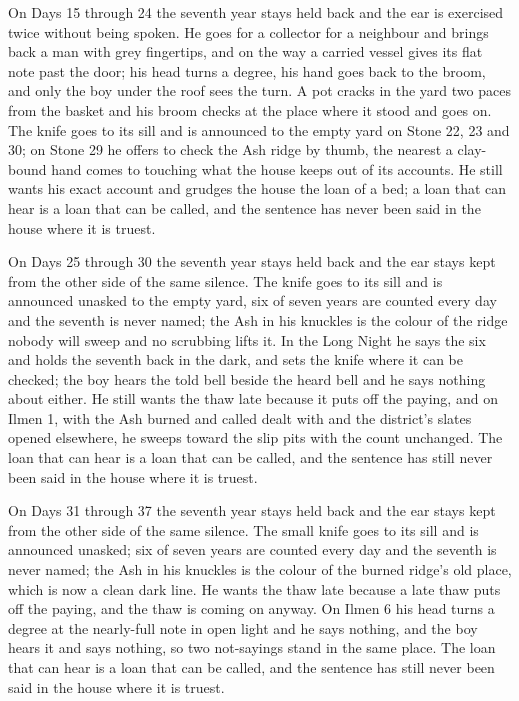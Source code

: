 \documentclass{design/chronicle}
\begin{document}
{On Days 15 through 24 the seventh year stays held back and the ear is exercised twice without being spoken. He goes for a collector for a neighbour and brings back a man with grey fingertips, and on the way a carried vessel gives its flat note past the door; his head turns a degree, his hand goes back to the broom, and only the boy under the roof sees the turn. A pot cracks in the yard two paces from the basket and his broom checks at the place where it stood and goes on. The knife goes to its sill and is announced to the empty yard on Stone 22, 23 and 30; on Stone 29 he offers to check the Ash ridge by thumb, the nearest a clay-bound hand comes to touching what the house keeps out of its accounts. He still wants his exact account and grudges the house the loan of a bed; a loan that can hear is a loan that can be called, and the sentence has never been said in the house where it is truest.

On Days 25 through 30 the seventh year stays held back and the ear stays kept from the other side of the same silence. The knife goes to its sill and is announced unasked to the empty yard, six of seven years are counted every day and the seventh is never named; the Ash in his knuckles is the colour of the ridge nobody will sweep and no scrubbing lifts it. In the Long Night he says the six and holds the seventh back in the dark, and sets the knife where it can be checked; the boy hears the told bell beside the heard bell and he says nothing about either. He still wants the thaw late because it puts off the paying, and on Ilmen 1, with the Ash burned and called dealt with and the district’s slates opened elsewhere, he sweeps toward the slip pits with the count unchanged. The loan that can hear is a loan that can be called, and the sentence has still never been said in the house where it is truest.

On Days 31 through 37 the seventh year stays held back and the ear stays kept from the other side of the same silence. The small knife goes to its sill and is announced unasked; six of seven years are counted every day and the seventh is never named; the Ash in his knuckles is the colour of the burned ridge’s old place, which is now a clean dark line. He wants the thaw late because a late thaw puts off the paying, and the thaw is coming on anyway. On Ilmen 6 his head turns a degree at the nearly-full note in open light and he says nothing, and the boy hears it and says nothing, so two not-sayings stand in the same place. The loan that can hear is a loan that can be called, and the sentence has still never been said in the house where it is truest.

}
\end{document}
